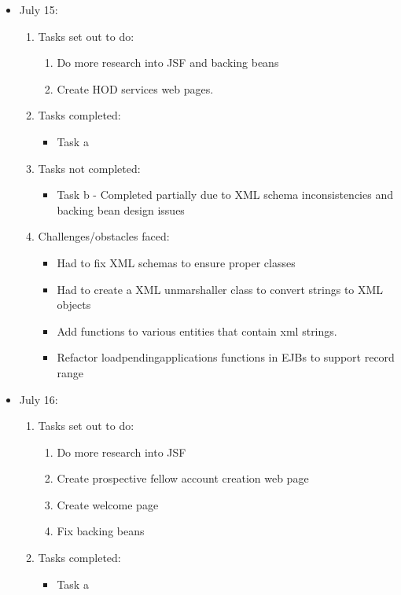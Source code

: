 \documentclass[12pt]{article}
\begin{document}
	\begin{itemize}
	\item July 15:
	\begin{enumerate}
		\item Tasks set out to do:
		\begin{enumerate}
			\item Do more research into JSF and backing beans
			\item Create HOD services web pages. 				
		\end{enumerate}
		\item Tasks completed:
		\begin{itemize}
			\item Task a								
		\end{itemize}
		\item Tasks not completed:
		\begin{itemize}
			\item Task b - Completed partially due to XML schema inconsistencies and backing bean design issues 
		\end{itemize}
		\item Challenges/obstacles faced:
		\begin{itemize}
			\item Had to fix XML schemas to ensure proper classes
			\item Had to create a XML unmarshaller class to convert strings to XML objects
			\item Add functions to various entities that contain xml strings.
			\item Refactor loadpendingapplications functions in EJBs to support record range
		\end{itemize}			
	\end{enumerate}
	\item July 16:
	\begin{enumerate}
		\item Tasks set out to do:
		\begin{enumerate}
			\item Do more research into JSF
			\item Create prospective fellow account creation web page
			\item Create welcome page
			\item Fix backing beans				
		\end{enumerate}
		\item Tasks completed:
		\begin{itemize}
			\item Task a

\end{itemize}
\end{enumerate}
\end{itemize}
\end{document}

